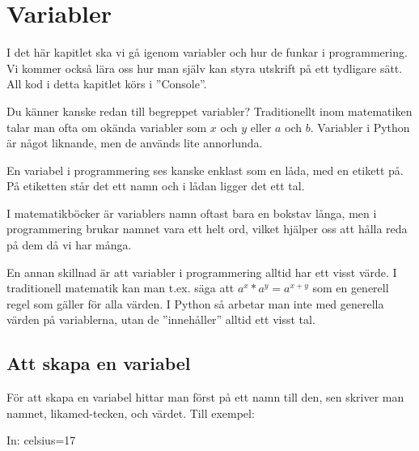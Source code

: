 %
%

\chapter{Variabler}\label{ch:variabler}

I det här kapitlet ska vi gå igenom variabler och hur de funkar i programmering. Vi kommer också lära oss hur man själv kan styra utskrift på ett tydligare sätt. All kod i detta kapitlet körs i ''Console''.

Du känner kanske redan till begreppet variabler? Traditionellt inom matematiken talar man ofta om okända variabler som $x$ och $y$ eller $a$ och $b$. Variabler i Python är något liknande, men de används lite annorlunda.

En variabel i programmering ses kanske enklast som en låda, med en etikett på. På etiketten står det ett namn och i lådan ligger det ett tal.

I matematikböcker är variablers namn oftast bara en bokstav långa, men i programmering brukar namnet vara ett helt ord, vilket hjälper oss att hålla reda på dem då vi har många.

En annan skillnad är att variabler i programmering alltid har ett visst värde. I traditionell matematik kan man t.ex. säga att $a^x*a^y=a^{x+y}$ som en generell regel som gäller för alla värden. I Python så arbetar man inte med generella värden på variablerna, utan de ''innehåller'' alltid ett visst tal.



\section{Att skapa en variabel}
För att skapa en variabel hittar man först på ett namn till den, sen skriver man namnet, likamed-tecken, och värdet. Till exempel:
\begin{python}[caption={Skapa variabeln celsius},label={}]
In: celsius=17
\end{python}

